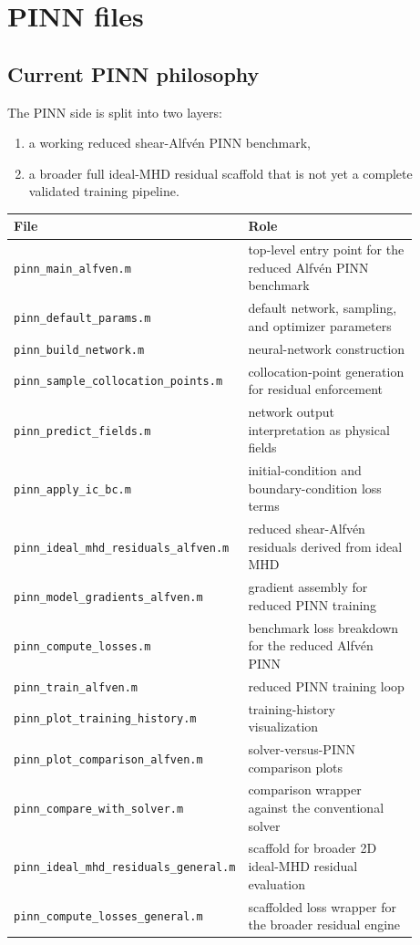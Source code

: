 \documentclass[11pt]{article}
\begin{document}
\section{PINN files}
\subsection{Current PINN philosophy}
The PINN side is split into two layers:
\begin{enumerate}[leftmargin=1.8em]
    \item a working reduced shear-Alfv\'en PINN benchmark,
    \item a broader full ideal-MHD residual scaffold that is not yet a complete validated training pipeline.
\end{enumerate}

\begin{center}
\begin{tabular}{p{0.33\linewidth} p{0.55\linewidth}}
\toprule
\textbf{File} & \textbf{Role} \\
\midrule
\texttt{pinn\_main\_alfven.m} & top-level entry point for the reduced Alfv\'en PINN benchmark \\
\texttt{pinn\_default\_params.m} & default network, sampling, and optimizer parameters \\
\texttt{pinn\_build\_network.m} & neural-network construction \\
\texttt{pinn\_sample\_collocation\_points.m} & collocation-point generation for residual enforcement \\
\texttt{pinn\_predict\_fields.m} & network output interpretation as physical fields \\
\texttt{pinn\_apply\_ic\_bc.m} & initial-condition and boundary-condition loss terms \\
\texttt{pinn\_ideal\_mhd\_residuals\_alfven.m} & reduced shear-Alfv\'en residuals derived from ideal MHD \\
\texttt{pinn\_model\_gradients\_alfven.m} & gradient assembly for reduced PINN training \\
\texttt{pinn\_compute\_losses.m} & benchmark loss breakdown for the reduced Alfv\'en PINN \\
\texttt{pinn\_train\_alfven.m} & reduced PINN training loop \\
\texttt{pinn\_plot\_training\_history.m} & training-history visualization \\
\texttt{pinn\_plot\_comparison\_alfven.m} & solver-versus-PINN comparison plots \\
\texttt{pinn\_compare\_with\_solver.m} & comparison wrapper against the conventional solver \\
\texttt{pinn\_ideal\_mhd\_residuals\_general.m} & scaffold for broader 2D ideal-MHD residual evaluation \\
\texttt{pinn\_compute\_losses\_general.m} & scaffolded loss wrapper for the broader residual engine \\
\bottomrule
\end{tabular}
\end{center}
\end{document}
